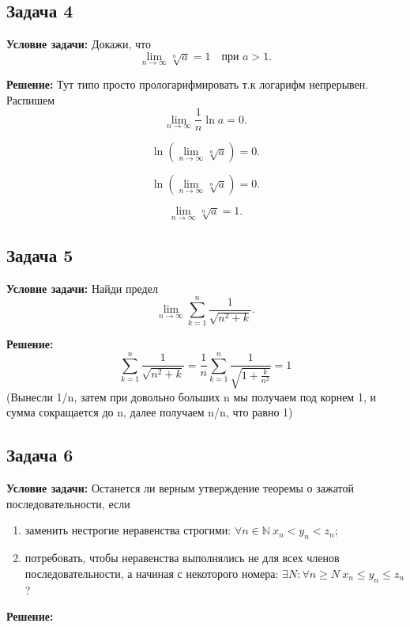 \documentclass[a4paper,12pt]{article}
\begin{document}
\vspace{1cm}

\subsection{Задача 4}


\textbf{Условие задачи:}
Докажи, что
\[
\lim_{n \to \infty} \sqrt[n]{a} = 1 \quad \text{при } a > 1.
\]

\textbf{Решение:}
Тут типо просто прологарифмировать т.к логарифм непрерывен. Распишем
\[
\lim_{n \to \infty} \frac{1}{n} \ln a = 0.
\]

\[
\ln \left( \lim_{n \to \infty} \sqrt[n]{a} \right) = 0.
\]

\[
\ln \left( \lim_{n \to \infty} \sqrt[n]{a} \right) = 0.
\]

\[
\lim_{n \to \infty} \sqrt[n]{a} = 1.
\]

\vspace{1cm}

\subsection{Задача 5}


\textbf{Условие задачи:}
Найди предел
\[
\lim_{n \to \infty} \sum_{k=1}^{n} \frac{1}{\sqrt{n^2 + k}}.
\]

\textbf{Решение:}
\[
\sum_{k=1}^{n} \frac{1}{\sqrt{n^2 + k}} = \frac{1}{n} \sum_{k=1}^{n} \frac{1}{\sqrt{1 + \frac{k}{n^2}}}=1
\] (Вынесли 1/n, затем при довольно больших n мы получаем под корнем 1, и сумма сокращается до n, далее получаем n/n, что равно 1)
\vspace{1cm}

\subsection{Задача 6}


\textbf{Условие задачи:}
Останется ли верным утверждение теоремы о зажатой последовательности, если
\begin{enumerate}[а)]
    \item заменить нестрогие неравенства строгими: $\forall n \in \mathbb{N}\ x_n < y_n < z_n$;
    \item потребовать, чтобы неравенства выполнялись не для всех членов последовательности, а начиная с некоторого номера: $\exists N : \forall n \geq N\ x_n \leq y_n \leq z_n$?
\end{enumerate}

\textbf{Решение:}
\end{document}
